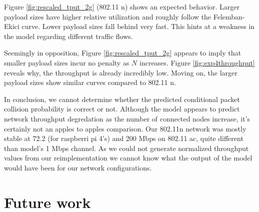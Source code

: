 Figure \ref{fig:rescaled_tput_2g} (802.11 n) shows an expected behavior. Larger
payload sizes have higher relative utilization and roughly follow the
Felemban-Ekici curve. Lower payload sizes fall behind very fast. This hints at
a weakness in the model regarding different traffic flows.

Seemingly in opposition, Figure \ref{fig:rescaled_tput_2g} appears to imply
that smaller payload sizes incur no penalty as $N$ increases. Figure
\ref{fig:exp4throughput} reveals why, the throughput is already incredibly
low. Moving on, the larger payload sizes show similar curves compared to
802.11 n.

In conclusion, we cannot determine whether the predicted conditional packet
collision probability is correct or not. Although the model appears to predict
network throughput degredation as the number of connected nodes increase, it's
certainly not an apples to apples comparison. Our 802.11n network was mostly
stable at 72.2 (for raspberri pi 4's) and 200 Mbps on 802.11 ac, quite
different than model's 1 Mbps channel. As we could not generate normalized
throughput values from our reimplementation we cannot know what the output of
the model would have been for our network configurations.


\section{Future work}


